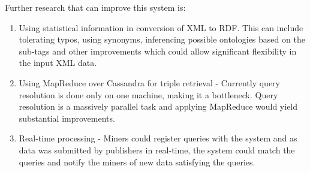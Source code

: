 \documentclass[journal]{IEEEtran}
\begin{document}
Further research that can improve this system is:
\begin{enumerate}

    \item Using statistical information in conversion of XML to RDF. This can
        include tolerating typos, using synonyms, inferencing possible
        ontologies based on the sub-tags and other improvements which could
        allow significant flexibility in the input XML data.

    \item Using MapReduce over Cassandra for triple retrieval - Currently query
        resolution is done only on one machine, making it a bottleneck. Query
        resolution is a massively parallel task and applying
        MapReduce\cite{Dean04mapreduce:simplified}\cite{hus09hadoop} would
        yield substantial improvements.

    \item Real-time processing - Miners could register queries with the system
        and as data was submitted by publishers in real-time, the system could
        match the queries and notify the miners of new data satisfying the
        queries\cite{Aba03aurora}.
\end{enumerate}
\end{document}
